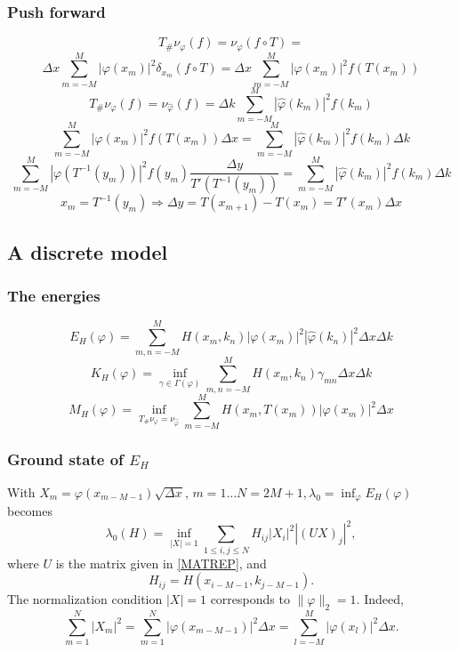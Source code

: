 \documentclass[12pt,a4paper]{article}
\begin{document}
\begin{appendices}
\subsubsection{Push forward}
\[ T_{\#} \nu_{\varphi} (f) = \nu_{\varphi} (f \circ T) = \]
\[\Delta x \sum_{m = -
   M}^M | \varphi (x_m) |^2 \delta_{x_m} (f \circ T) = \Delta x \sum_{m = -
   M}^M | \varphi (x_m) |^2 f (T (x_m)) \]
\[ T_{\#} \nu_{\varphi} (f) = \nu_{\hat{\varphi}} (f) = \Delta k \sum_{m = -
   M}^M | \hat{\varphi} (k_m) |^2 f (k_m) \]
\[ \sum_{m = - M}^M | \varphi (x_m) |^2 f (T (x_m)) \Delta x = \sum_{m = -
   M}^M | \hat{\varphi} (k_m) |^2 f (k_m) \Delta k \]
\[ \sum_{m = - M}^M | \varphi (T^{- 1} (y_m)) |^2 f (y_m)  \frac{\Delta y}{T'
   (T^{- 1} (y_m))} = \sum_{m = - M}^M | \hat{\varphi} (k_m) |^2 f (k_m)
   \Delta k \]
\[ x_m = T^{- 1} (y_m) \Rightarrow \Delta y = T (x_{m + 1}) - T (x_m) = T'
   (x_m) \Delta x \]
\subsection{A discrete model}
\subsubsection{The energies}
\[ E_H (\varphi) = \sum_{m, n = - M}^M H (x_m, k_n)  | \varphi (x_m) |^2 |
   \hat{\varphi} (k_n) |^2 \Delta x \Delta k \]
\[ K_H (\varphi) = \inf_{\gamma \in \Gamma (\varphi)} \sum_{m, n = - M}^M H
   (x_m, k_n) \gamma_{m n} \Delta x \Delta k \]
\[ M_H (\varphi) = \inf_{T_{\#} \nu_{\varphi} = \nu_{\hat{\varphi}}}  \sum_{m
   = - M}^M H (x_m, T (x_m))  | \varphi (x_m) |^2 \Delta x \]
\subsubsection{Ground state of $E_H$}
With $X_m = \varphi (x_{m - M - 1}) \sqrt{\Delta x}$, $m = 1 \ldots N = 2 M +
1, \lambda_0 = \inf_{\varphi} E_H (\varphi)$ becomes
\[ \lambda_0 (H) = \inf_{| X | = 1} \sum_{1 \leqslant i, j \leqslant N} H_{i
   j}  | X_i |^2  | (U X)_j |^2, \]
where $U$ is the matrix given in \ref{MATREP}, and
\[ H_{i j} = H (x_{i - M - 1}, k_{j - M - 1}) . \]
The normalization condition $| X | = 1$ corresponds to $\| \varphi \|_2 = 1$.
Indeed,
\[ \sum_{m = 1}^N | X_m |^2 = \sum_{m = 1}^N | \varphi (x_{m - M - 1}) |^2
   \Delta x = \sum_{l = - M}^M | \varphi (x_l) |^2 \Delta x. \]

\end{appendices}
\end{document}
